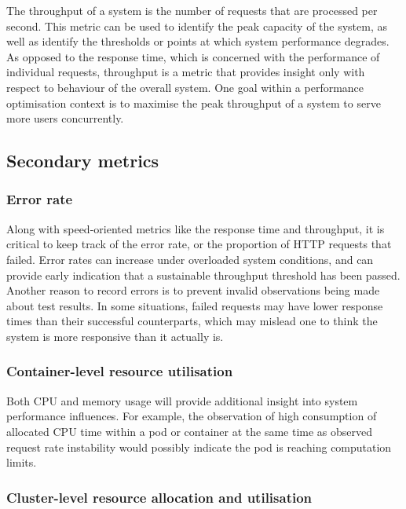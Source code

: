 The throughput of a system is the number of requests that are processed per second. This metric can be used to identify the peak capacity of the system, as well as identify the thresholds or points at which system performance degrades. As opposed to the response time, which is concerned with the performance of individual requests, throughput is a metric that provides insight only with respect to behaviour of the overall system. One goal within a performance optimisation context is to maximise the peak throughput of a system to serve more users concurrently.

\subsection{Secondary metrics}

\subsubsection{Error rate}

Along with speed-oriented metrics like the response time and throughput, it is critical to keep track of the error rate, or the proportion of HTTP requests that failed. Error rates can increase under overloaded system conditions, and can provide early indication that a sustainable throughput threshold has been passed. Another reason to record errors is to prevent invalid observations being made about test results. In some situations, failed requests may have lower response times than their successful counterparts, which may mislead one to think the system is more responsive than it actually is.

\subsubsection{Container-level resource utilisation}

Both CPU and memory usage will provide additional insight into system performance influences. For example, the observation of high consumption of allocated CPU time within a pod or container at the same time as observed request rate instability would possibly indicate the pod is reaching computation limits.

\subsubsection{Cluster-level resource allocation and utilisation}

